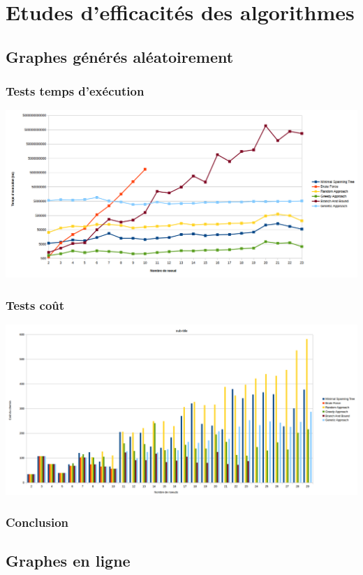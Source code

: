 \documentclass[10pt,a4paper]{report}
\begin{document}
\section{Etudes d'efficacités des algorithmes}

	\subsection{Graphes générés aléatoirement}
		\subsubsection{Tests temps d'exécution}
			\includegraphics[scale=0.45]{./Ressource/temps_graphes_random.png}	
		
		\subsubsection{Tests coût}
			
			\includegraphics[scale=0.40]{./Ressource/cout_graphes_random.png}
			
		\subsubsection{Conclusion}
			
	\subsection{Graphes en ligne}
\end{document}
